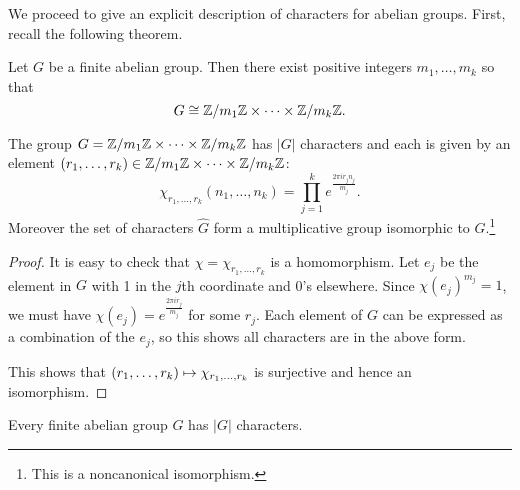 We proceed to give an explicit description of characters for abelian groups. First, recall the following theorem.
\begin{thm}
Let $G$ be a finite abelian group. Then there exist positive integers $m_1,\ldots, m_k$ so that
\[G\cong \mathbb{Z}/{m_1}\mathbb{Z}\times \cdots \times \mathbb{Z}/{m_k}\mathbb{Z}.\]
\end{thm}
\begin{thm}
The group $G=\mathbb{Z}/{m_1}\mathbb{Z}\times \cdots \times \mathbb{Z}/{m_k}\mathbb{Z}$ has $|G|$ characters and each is given by an element $(r_1,\ldots, r_k)\in \mathbb{Z}/{m_1}\mathbb{Z}\times \cdots \times \mathbb{Z}/{m_k}\mathbb{Z}$:
\[\chi_{r_1,\ldots, r_k}(n_1,\ldots, n_k)=\prod_{j=1}^k e^{\frac{2\pi ir_jn_j}{m_j}}.\]
Moreover the set of characters $\widehat{G}$ form a multiplicative group isomorphic to $G$.\footnote{This is a noncanonical isomorphism.}
\end{thm}
\begin{proof}
It is easy to check that $\chi=\chi_{r_1,\ldots, r_k}$ is a homomorphism. Let $e_j$ be the element in $G$ with 1 in the $j$th coordinate and 0's elsewhere. Since $\chi(e_j)^{m_j}=1$, we must have $\chi(e_j)=e^{\frac{2\pi ir_j}{m_j}}$ for some $r_j$. Each element of $G$ can be expressed as a combination of the $e_j$, so this shows all characters are in the above form.

This shows that $(r_1,\ldots, r_k)\mapsto \chi_{r_1,\ldots, r_k}$ is surjective and hence an isomorphism.
\end{proof}
\begin{cor}
Every finite abelian group $G$ has $|G|$ characters.
\end{cor}
